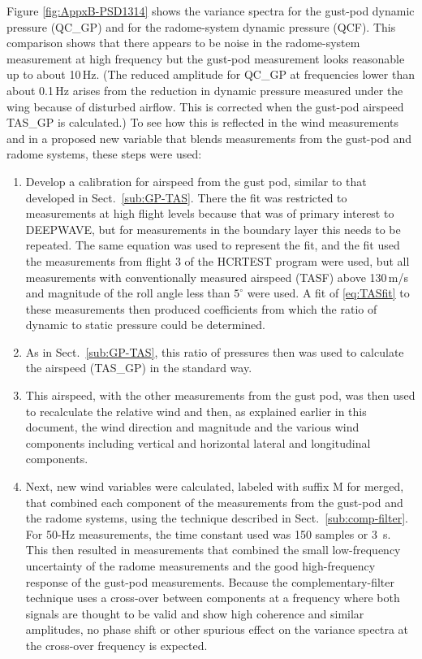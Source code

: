 \documentclass[12pt,twoside,english]{article}\usepackage[]{graphicx}\usepackage[]{color}
\let\OrgIndex\index
\renewcommand*{\index}[1]{\OrgIndex{#1}}
\begin{document}
Figure \ref{fig:AppxB-PSD1314} shows the variance spectra for the gust-pod dynamic pressure (QC\_GP) and for the radome-system dynamic pressure (QCF). This comparison shows that there appears to be noise in the radome-system measurement at high frequency but the gust-pod measurement looks reasonable up to about 10\,Hz. (The reduced amplitude for QC\_GP at frequencies lower than about 0.1\,Hz arises from the reduction in dynamic pressure measured under the wing because of disturbed airflow. This is corrected when the gust-pod airspeed TAS\_GP is calculated.) To see how this is reflected in the wind measurements and in a proposed new variable that blends measurements from the gust-pod and radome systems, these steps were used: 

\begin{enumerate}
\item Develop a calibration for airspeed from the gust pod, similar to that developed in Sect.~\ref{sub:GP-TAS}. There the fit was restricted to measurements at high flight levels because that was of primary interest to DEEPWAVE, but for measurements in the boundary layer this needs to be repeated. The same equation was used to represent the fit, and the fit used the measurements from flight 3 of the HCRTEST program were used, but all measurements with conventionally measured airspeed (TASF) above 130\,m/s and magnitude of the roll angle less than $5^{\circ}$ were used. A fit of \eqref{eq:TASfit} to these measurements then produced coefficients from which the ratio of dynamic to static pressure could be determined. 
\item As in Sect.~\ref{sub:GP-TAS}, this ratio of pressures then was used to calculate the airspeed (TAS\_GP) in the standard way. 
\item This airspeed, with the other measurements from the gust pod, was then used to recalculate the relative wind and then, as explained earlier in this document, the wind direction and magnitude and the various wind components including vertical and horizontal lateral and longitudinal components. 
\item Next, new wind variables were calculated, labeled with suffix \textquotedbl{}M\textquotedbl{} for \textquotedbl{}merged\textquotedbl{}, that combined each component of the measurements from the gust-pod and the radome systems, using the technique described in Sect.~\ref{sub:comp-filter}. For 50-Hz measurements, the time constant used was 150 samples or 3~s. This then resulted in measurements that combined the small low-frequency uncertainty of the radome measurements and the good high-frequency response of the gust-pod measurements. Because the complementary-filter technique uses a cross-over between components at a frequency where both signals are thought to be valid and show high coherence and similar amplitudes, no phase shift or other spurious effect on the variance spectra at the cross-over frequency is expected. 
\end{enumerate}
\end{document}
